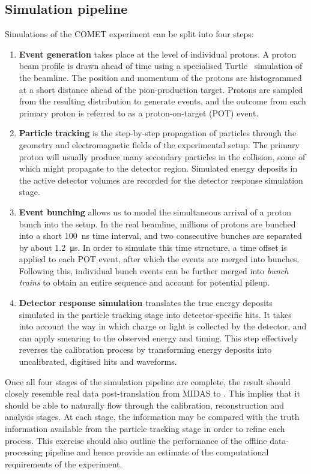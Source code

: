 \subsection{Simulation pipeline}
Simulations of the COMET experiment can be split into four steps:
\begin{enumerate}
    \item {\bf Event generation} takes place at the level of individual protons.
    A proton beam profile is drawn ahead of time using a specialised
    Turtle~\cite{Carey1974DecayT} simulation of the beamline. The position and
    momentum of the protons are histogrammed at a short distance ahead of the
    pion-production target. Protons are sampled from the resulting distribution
    to generate events, and the outcome from each primary proton is referred to
    as a proton-on-target (POT) event.
    \item {\bf Particle tracking} is the step-by-step propagation of particles
    through the geometry and electromagnetic fields of the experimental setup.
    The primary proton will usually produce many secondary particles in the
    collision, some of which might propagate to the detector region. Simulated
    energy deposits in the active detector volumes are recorded for the detector
    response simulation stage.
    \item {\bf Event bunching} allows us to model the simultaneous arrival of a
    proton bunch into the setup. In the real beamline, millions of protons are
    bunched into a short \SI{100}{\ns} time interval, and two consecutive
    bunches are separated by about \SI{1.2}{\micro\second}. In order to simulate
    this time structure, a time offset is applied to each POT event, after which
    the events are merged into bunches. Following this, individual bunch events
    can be further merged into \emph{bunch trains} to obtain an entire sequence
    and account for potential pileup.
    \item {\bf Detector response simulation} translates the true energy deposits
    simulated in the particle tracking stage into detector-specific hits. It
    takes into account the way in which charge or light is collected by the
    detector, and can apply smearing to the observed energy and timing. This
    step effectively reverses the calibration process by transforming energy
    deposits into uncalibrated, digitised hits and waveforms.
\end{enumerate}

Once all four stages of the simulation pipeline are complete, the result should
closely resemble real data post-translation from MIDAS to \oaEvent. This implies
that it should be able to naturally flow through the calibration, reconstruction
and analysis stages. At each stage, the information may be compared with the
truth information available from the particle tracking stage in order to refine
each process. This exercise should also outline the performance of the offline
data-processing pipeline and hence provide an estimate of the computational
requirements of the experiment.


